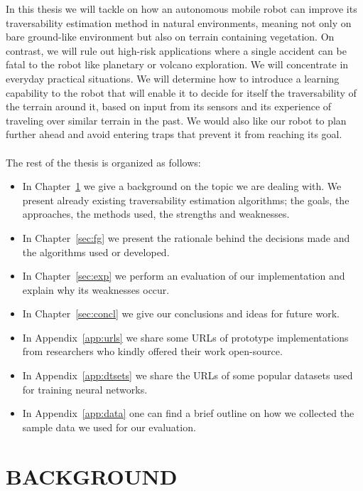 \documentclass[12pt,a4paper,table,dvipsnames,tikz]{report}
\newcommand{\acronym}{\MakeUppercase}
\begin{document}
	In this thesis we will tackle on how an autonomous mobile robot can improve its 
	traversability estimation method in natural environments, meaning not 
	only on bare ground-like environment but also on terrain containing vegetation. 
	On contrast, we will rule out high-risk applications where a single accident can 
	be fatal to the robot like planetary or volcano exploration. We will concentrate 
	in everyday practical situations. We will determine how to introduce a learning 
	capability to the robot that will enable it to decide for itself the 
	traversability of the terrain around it, based on input from its sensors 
	and its experience of traveling over similar terrain in the past. We would also 
	like our robot to plan further ahead and avoid entering traps that prevent it 
	from reaching its goal.
	\\\\
	
	The rest of the thesis is organized as follows:
	\begin{itemize}
		\item In Chapter~\ref{sec:bg} we give a background on the topic we are dealing 
		with. We present already existing traversability estimation algorithms; the 
		goals, the approaches, the methods used, the strengths and weaknesses. 
		\item In Chapter~\ref{sec:fg} we present the rationale behind the decisions made 
		and the algorithms used or developed.
		\item In Chapter~\ref{sec:exp} we perform an evaluation of our implementation 
		and explain why its weaknesses occur.
		\item In Chapter~\ref{sec:concl} we give our conclusions and ideas for future 
		work.
		\item In Appendix~\ref{app:urls} we share some \acronym{url}s of prototype 
		implementations from researchers who kindly offered their work open-source. 
		\item In Appendix~\ref{app:dtsets} we share the \acronym{url}s of some popular 
		datasets used for training neural networks.
		\item In Appendix~\ref{app:data} one can find a brief outline on how 
		we collected the sample data we used for our evaluation.
	\end{itemize}
	
	\chapter{BACKGROUND}
	\label{sec:bg}
	
\end{document}
